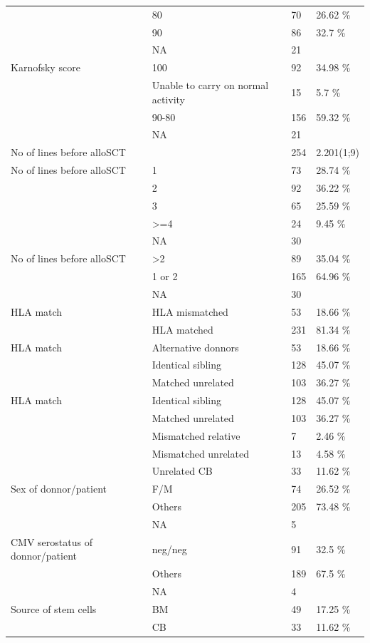 \documentclass[a4paper,11pt] {article}
\begin{document}
\begin{longtable}{llll}
   & 80 & 70 & 26.62 \% \\ 
   & 90 & 86 & 32.7 \% \\ 
   & NA & 21 &  \\ 
  Karnofsky score & 100 & 92 & 34.98 \% \\ 
   & Unable to carry on normal activity & 15 & 5.7 \% \\ 
   & 90-80 & 156 & 59.32 \% \\ 
   & NA & 21 &  \\ 
  No of lines before alloSCT &  & 254 & 2.201(1;9) \\ 
  No of lines before alloSCT & 1 & 73 & 28.74 \% \\ 
   & 2 & 92 & 36.22 \% \\ 
   & 3 & 65 & 25.59 \% \\ 
   & >=4 & 24 & 9.45 \% \\ 
   & NA & 30 &  \\ 
  No of lines before alloSCT & >2 & 89 & 35.04 \% \\ 
   & 1 or 2 & 165 & 64.96 \% \\ 
   & NA & 30 &  \\ 
  HLA match & HLA mismatched & 53 & 18.66 \% \\ 
   & HLA matched & 231 & 81.34 \% \\ 
  HLA match & Alternative donnors & 53 & 18.66 \% \\ 
   & Identical sibling & 128 & 45.07 \% \\ 
   & Matched unrelated & 103 & 36.27 \% \\ 
  HLA match & Identical sibling & 128 & 45.07 \% \\ 
   & Matched unrelated & 103 & 36.27 \% \\ 
   & Mismatched relative & 7 & 2.46 \% \\ 
   & Mismatched unrelated & 13 & 4.58 \% \\ 
   & Unrelated CB & 33 & 11.62 \% \\ 
  Sex of donnor/patient & F/M & 74 & 26.52 \% \\ 
   & Others & 205 & 73.48 \% \\ 
   & NA & 5 &  \\ 
  CMV serostatus of donnor/patient & neg/neg & 91 & 32.5 \% \\ 
   & Others & 189 & 67.5 \% \\ 
   & NA & 4 &  \\ 
  Source of stem cells & BM & 49 & 17.25 \% \\ 
   & CB & 33 & 11.62 \% \\ 

\end{longtable}
\end{document}
